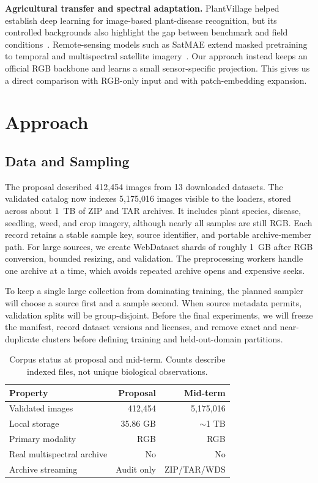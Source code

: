 \documentclass[10pt,twocolumn,letterpaper]{article}
\begin{document}
\textbf{Agricultural transfer and spectral adaptation.} PlantVillage helped
establish deep learning for image-based plant-disease recognition, but its
controlled backgrounds also highlight the gap between benchmark and field
conditions~\cite{hughes2015plantvillage,mohanty2016using}. Remote-sensing models
such as SatMAE extend masked pretraining to temporal and multispectral satellite
imagery~\cite{cong2022satmae}. Our approach instead keeps an official RGB
backbone and learns a small sensor-specific projection. This gives us a direct
comparison with RGB-only input and with patch-embedding expansion.

\section{Approach}
\subsection{Data and Sampling}
The proposal described 412,454 images from 13 downloaded datasets. The validated
catalog now indexes 5,175,016 images visible to the loaders, stored across about
1~TB of ZIP and TAR archives. It includes plant species, disease, seedling, weed,
and crop imagery, although nearly all samples are still RGB. Each record retains
a stable sample key, source identifier, and portable archive-member path. For
large sources, we create WebDataset shards of roughly 1~GB after RGB conversion,
bounded resizing, and validation. The preprocessing workers handle one archive
at a time, which avoids repeated archive opens and expensive seeks.

To keep a single large collection from dominating training, the planned sampler
will choose a source first and a sample second. When source metadata permits,
validation splits will be group-disjoint. Before the final experiments, we will
freeze the manifest, record dataset versions and licenses, and remove exact and
near-duplicate clusters before defining training and held-out-domain partitions.

\begin{table}[t]
\centering
\caption{Corpus status at proposal and mid-term. Counts describe indexed files,
not unique biological observations.}
\label{tab:corpus}
\small
\begin{tabular}{lrr}
\toprule
Property & Proposal & Mid-term \\
\midrule
Validated images & 412,454 & 5,175,016 \\
Local storage & 35.86 GB & $\sim$1 TB \\
Primary modality & RGB & RGB \\
Real multispectral archive & No & No \\
Archive streaming & Audit only & ZIP/TAR/WDS \\
\bottomrule
\end{tabular}
\end{table}
\end{document}
